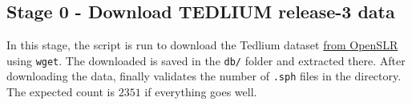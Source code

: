 \subsection{Stage 0 - Download TEDLIUM release-3 data}
In this stage, the  script is run to download the Tedlium dataset \href{http://www.openslr.org/resources/51/TEDLIUM_release-3.tgz }{from OpenSLR} using \texttt{wget}.
The downloaded  is saved in the \texttt{db/} folder and extracted there.
After downloading the data,  finally validates the number of \texttt{.sph} files in the  directory. The expected count is $2351$ if everything goes well.
